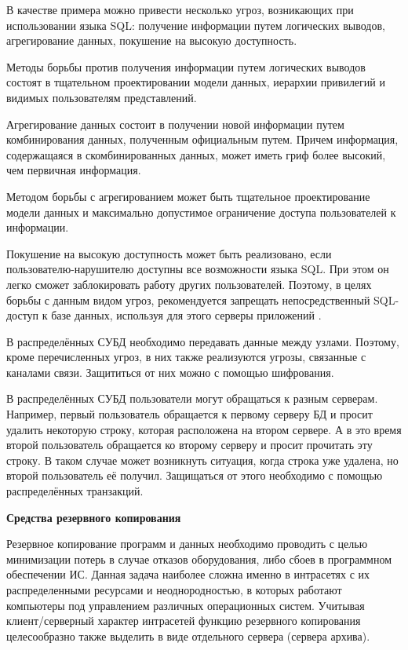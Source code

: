 В качестве примера можно привести несколько угроз, возникающих при использовании языка SQL: получение
информации путем логических выводов, агрегирование данных, покушение на высокую доступность.

Методы борьбы против получения информации путем логических выводов состоят в тщательном проектировании
модели данных, иерархии привилегий и видимых пользователям представлений.

Агрегирование данных состоит в получении новой информации путем комбинирования данных, полученным официальным
путем. Причем информация, содержащаяся в скомбинированных данных, может иметь гриф более высокий, чем первичная информация.

Методом борьбы с агрегированием может быть тщательное проектирование модели данных и максимально допустимое
ограничение доступа пользователей к информации.

Покушение на высокую доступность может быть реализовано, если пользователю-нарушителю доступны все возможности
языка SQL. При этом он легко сможет заблокировать работу других пользователей. Поэтому, в целях борьбы с данным
видом угроз, рекомендуется запрещать непосредственный SQL-доступ к базе данных, используя для этого серверы приложений \autocite{DistrDBThreats}.

В распределённых СУБД необходимо передавать данные между узлами. 
Поэтому, кроме перечисленных угроз, в них также реализуются угрозы, связанные с каналами связи.
Защититься от них можно с помощью шифрования.

В распределённых СУБД пользователи могут обращаться к разным серверам.
Например, первый пользователь обращается к первому серверу БД и просит удалить некоторую строку, которая расположена на втором сервере.
А в это время второй пользователь обращается ко второму серверу и просит прочитать эту строку.
В таком случае может возникнуть ситуация, когда строка уже удалена, но второй пользователь её получил.
Защищаться от этого необходимо с помощью распределённых транзакций.

\bigbreak
\textbf{Средства резервного копирования}

Резервное копирование программ и данных необходимо проводить с целью минимизации потерь в случае отказов
оборудования, либо сбоев в программном обеспечении ИС. Данная задача наиболее сложна именно в интрасетях
с их распределенными ресурсами и неоднородностью, в которых работают компьютеры под управлением различных
операционных систем. Учитывая клиент/серверный характер интрасетей функцию резервного копирования целесообразно
также выделить в виде отдельного сервера (сервера архива).

